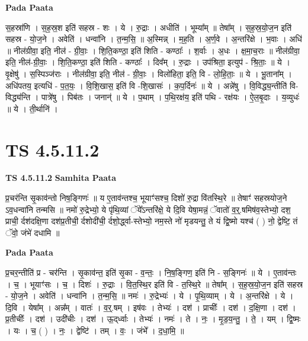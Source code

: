 \documentclass[17pt]{extarticle}
\begin{document}
\textbf{Pada Paata} \newline

स॒हस्रा॑णि । स॒ह॒स्र॒श इति॑ सहस्र - शः । ये । रु॒द्राः । अधीति॑ । भूम्या᳚म् ॥ तेषा᳚म् । स॒ह॒स्र॒यो॒ज॒न इति॑ सहस्र - यो॒ज॒ने । अवेति॑ । धन्वा॑नि । त॒न्म॒सि॒ ॥ अ॒स्मिन्न् । म॒ह॒ति । अ॒र्ण॒वे । अ॒न्तरि॑क्षे । भ॒वाः । अधि॑ ॥ नील॑ग्रीवा॒ इति॒ नील॑ - ग्री॒वाः॒ । शि॒ति॒कण्ठा॒ इति॑ शिति - कण्ठाः᳚ । श॒र्वाः । अ॒धः । क्ष॒मा॒च॒राः ॥ नील॑ग्रीवा॒ इति॒ नील॑-ग्री॒वाः॒ । शि॒ति॒कण्ठा॒ इति॑ शिति - कण्ठाः᳚ । दिव᳚म् । रु॒द्राः । उप॑श्रिता॒ इत्युप॑ - श्रि॒ताः॒ ॥ ये । वृ॒क्षेषु॑ । स॒स्पिञ्ज॑राः । नील॑ग्रीवा॒ इति॒ नील॑ - ग्री॒वाः॒ । विलो॑हिता॒ इति॒ वि - लो॒हि॒ताः॒ ॥ ये । भू॒ताना᳚म् । अधि॑पतय॒ इत्यधि॑ - प॒त॒यः॒ । वि॒शि॒खास॒ इति॑ वि -शि॒खासः॑ । क॒प॒र्दिनः॑ ॥ ये । अन्ने॑षु । वि॒विद्ध्य॒न्तीति॑ वि-विद्ध्य॑न्ति । पात्रे॑षु । पिब॑तः । जनान्॑ ॥ ये । प॒थाम् । प॒थि॒रक्ष॑य॒ इति॑ पथि - रक्ष॑यः । ऐ॒ल॒बृ॒दाः । य॒व्युधः॑ ॥ ये । ती॒र्थानि॑ ।  \newline




\section*{ TS 4.5.11.2 }

\textbf{TS 4.5.11.2 } \newline
\textbf{Samhita Paata} \newline

प्र॒चर॑न्ति सृ॒काव॑न्तो निष॒ङ्गिणः॑ ॥                                     य ए॒ताव॑न्तश्च॒ भूयाꣳ॑सश्च॒ दिशो॑ रु॒द्रा वि॑तस्थि॒रे ॥ तेषाꣳ॑ सहस्रयोज॒ने ऽव॒धन्वा॑नि तन्मसि ॥                                              नमो॑ रु॒द्रेभ्यो॒ ये पृ॑थि॒व्यां ॅये᳚ऽन्तरि॑क्षे॒ ये दि॒वि येषा॒मन्नं॒ ॅवातो॑ व॒र्॒.षमिष॑व॒स्तेभ्यो॒ दश॒ प्राची॒ र्दश॑दक्षि॒णा दश॑प्र॒तीची॒ र्दशोदी॑ची॒ र्दशो॒र्द्ध्वा-स्तेभ्यो॒ नम॒स्ते नो॑ मृडयन्तु॒ ते यं द्वि॒ष्मो यश्च॑ ( ) नो॒ द्वेष्टि॒ तं ॅवो॒ जंभे॑ दधामि ॥ \newline

\textbf{Pada Paata} \newline

प्र॒चर॒न्तीति॑ प्र - चर॑न्ति । सृ॒काव॑न्त॒ इति॑ सृ॒का - व॒न्तः॒ । नि॒ष॒ङ्गिण॒ इति॑ नि - स॒ङ्गिनः॑ ॥ ये । ए॒ताव॑न्तः । च॒ । भूयाꣳ॑सः । च॒ । दिशः॑ । रु॒द्राः । वि॒त॒स्थि॒र इति॑ वि - त॒स्थि॒रे ॥ तेषा᳚म् । स॒ह॒स्र॒यो॒ज॒न इति॑ सहस्र - यो॒ज॒ने । अवेति॑ । धन्वा॑नि । त॒न्म॒सि॒ ॥ नमः॑ । रु॒द्रेभ्यः॑ । ये । पृ॒थि॒व्याम् । ये । अ॒न्तरि॑क्षे । ये । दि॒वि । येषा᳚म् । अन्न᳚म् । वातः॑ । व॒र्॒.षम् । इष॑वः । तेभ्यः॑ । दश॑ । प्राचीः᳚ । दश॑ । द॒क्षि॒णा । दश॑ । प्र॒तीचीः᳚ । दश॑ । उदी॑चीः । दश॑ । ऊ॒द्‌र्ध्वाः । तेभ्यः॑ । नमः॑ । ते । नः॒ । मृ॒ड॒य॒न्तु॒ । ते॒ । यम् । द्वि॒ष्मः । यः । च॒ ( ) । नः॒ । द्वेष्टि॑ । तम् । वः॒ । जंभे᳚ । द॒धा॒मि॒ ॥  \newline
\end{document}
